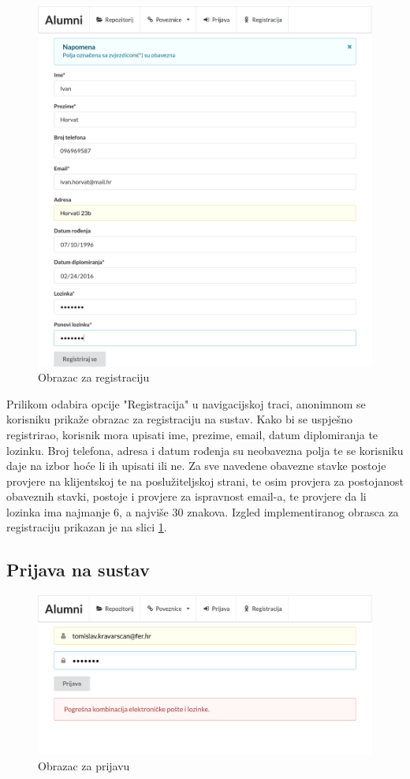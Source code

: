 \documentclass[zavrsni, numeric]{fer}
\begin{document}
\begin{figure}[H]
	\centering
	\includegraphics[width=13cm]{slike/registracija.png}
	\caption{Obrazac za registraciju}
	\label{fig:registracija}
\end{figure}

Prilikom odabira opcije "Registracija" u navigacijskoj traci, anonimnom se korisniku prikaže obrazac za registraciju na sustav. Kako bi se uspješno registrirao, korisnik mora upisati ime, prezime, email, datum diplomiranja te lozinku. Broj telefona, adresa i datum rođenja su neobavezna polja te se korisniku daje na izbor hoće li ih upisati ili ne. Za sve navedene obavezne stavke postoje provjere na klijentskoj te na poslužiteljskoj strani, te osim provjera za postojanost obaveznih stavki, postoje i provjere za ispravnost email-a, te provjere da li lozinka ima najmanje 6, a najviše 30 znakova. Izgled implementiranog obrasca za registraciju prikazan je na slici \ref{fig:registracija}.

\subsection{Prijava na sustav}

\begin{figure}[H]
	\centering
	\includegraphics[width=13cm]{slike/prijava.png}
	\caption{Obrazac za prijavu}
	\label{fig:prijava}
\end{figure}
\end{document}
